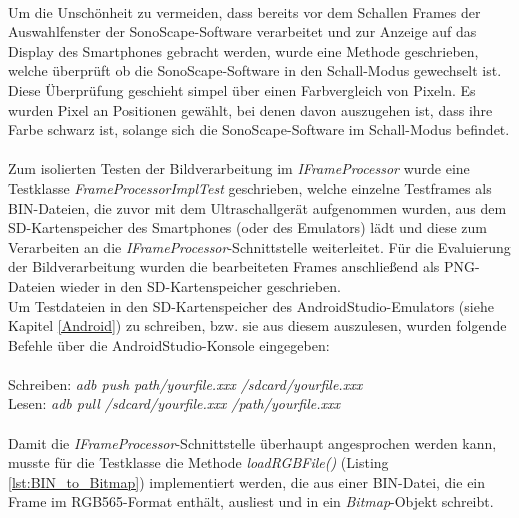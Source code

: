 ~\\
Um die Unschönheit zu vermeiden, dass bereits vor dem Schallen Frames der Auswahlfenster der SonoScape-Software verarbeitet und zur Anzeige auf das Display des Smartphones gebracht werden, wurde eine Methode geschrieben, welche überprüft ob die SonoScape-Software in den Schall-Modus gewechselt ist. Diese Überprüfung geschieht simpel über einen Farbvergleich von Pixeln. Es wurden Pixel an Positionen gewählt, bei denen davon auszugehen ist, dass ihre Farbe schwarz ist, solange sich die SonoScape-Software im Schall-Modus befindet.  
\\
\\
Zum isolierten Testen der Bildverarbeitung im \textit{IFrameProcessor} wurde eine Testklasse \textit{FrameProcessorImplTest} geschrieben, welche einzelne Testframes als BIN-Dateien, die zuvor mit dem Ultraschallgerät aufgenommen wurden, aus dem SD-Kartenspeicher des Smartphones (oder des Emulators) lädt und diese zum Verarbeiten an die \textit{IFrameProcessor}-Schnittstelle weiterleitet. Für die Evaluierung der Bildverarbeitung wurden die bearbeiteten Frames anschließend als PNG-Dateien wieder in den SD-Kartenspeicher geschrieben. 
\\
Um Testdateien in den SD-Kartenspeicher des AndroidStudio-Emulators (siehe Kapitel \ref{Android}) zu schreiben, bzw. sie aus diesem auszulesen, wurden folgende Befehle über die AndroidStudio-Konsole eingegeben:
\\
\\
Schreiben: \textit{adb push path/yourfile.xxx /sdcard/yourfile.xxx}
\\
Lesen: \textit{adb pull /sdcard/yourfile.xxx /path/yourfile.xxx}
\\
\\
Damit die \textit{IFrameProcessor}-Schnittstelle überhaupt angesprochen werden kann, musste für die Testklasse die Methode \textit{loadRGBFile()} (Listing \ref{lst:BIN_to_Bitmap}) implementiert werden, die aus einer BIN-Datei, die ein Frame im RGB565-Format enthält, ausliest und in ein \textit{Bitmap}-Objekt schreibt. 

